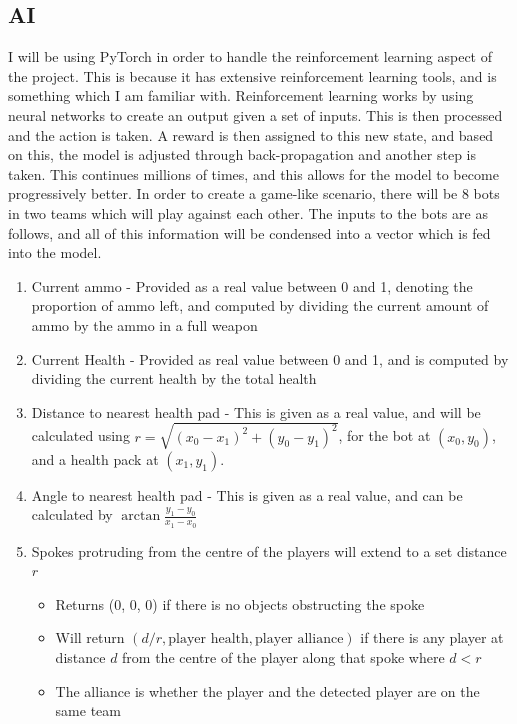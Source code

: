 \vs

\subsection{AI}

I will be using PyTorch in order to handle the reinforcement learning aspect of the project. This is because it has extensive reinforcement learning tools, and is something which I am familiar with. Reinforcement learning works by using neural networks to create an output given a set of inputs. This is then processed and the action is taken. A reward is then assigned to this new state, and based on this, the model is adjusted through back-propagation and another step is taken. This continues millions of times, and this allows for the model to become progressively better. In order to create a game-like scenario, there will be 8 bots in two teams which will play against each other. The inputs to the bots are as follows, and all of this information will be condensed into a vector which is fed into the model.

\vs
\begin{enumerate}[label=\arabic*)]
    \item Current ammo - Provided as a real value between 0 and 1, denoting the proportion of ammo left, and computed by dividing the current amount of ammo by the ammo in a full weapon
    \item Current Health - Provided as real value between 0 and 1, and is computed by dividing the current health by the total health
    \item Distance to nearest health pad - This is given as a real value, and will be calculated using $r = \sqrt{(x_0 - x_1)^2 + (y_0 - y_1)^2}$, for the bot at $(x_0, y_0)$, and a health pack at $(x_1, y_1)$.
    \item Angle to nearest health pad - This is given as a real value, and can be calculated by $\arctan \frac{y_1 - y_0}{x_1 - x_0}$
    \item Spokes protruding from the centre of the players will extend to a set distance $r$
    \begin{itemize}
        \item Returns (0, 0, 0) if there is no objects obstructing the spoke 
        \item Will return $(d/r, \text{player health}, \text{player alliance})$ if there is any player at distance $d$ from the centre of the player along that spoke where $d<r$
        \item The alliance is whether the player and the detected player are on the same team
    \end{itemize}
\end{enumerate}

